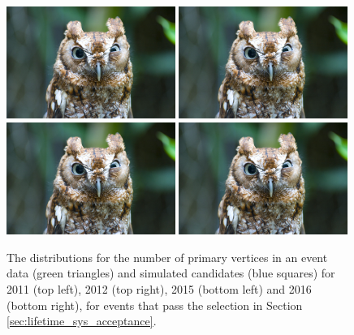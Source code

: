 {\begin{figure}[htbp]
  \centering
    \includegraphics[width=0.49\textwidth]{./Figs/placeholder.jpeg}
    \includegraphics[width=0.49\textwidth]{./Figs/placeholder.jpeg}
    \includegraphics[width=0.49\textwidth]{./Figs/placeholder.jpeg}
    \includegraphics[width=0.49\textwidth]{./Figs/placeholder.jpeg}
  \caption{The distributions for the number of primary vertices in an event \bdkpi data (green triangles) and simulated candidates (blue squares) for 2011 (top left), 2012 (top right), 2015 (bottom left) and 2016 (bottom right), for events that pass the selection in Section \ref{sec:lifetime_sys_acceptance}.}
  \label{fig:Bd2KPi_nPVs_MC_data_comparison}
\end{figure}


}
